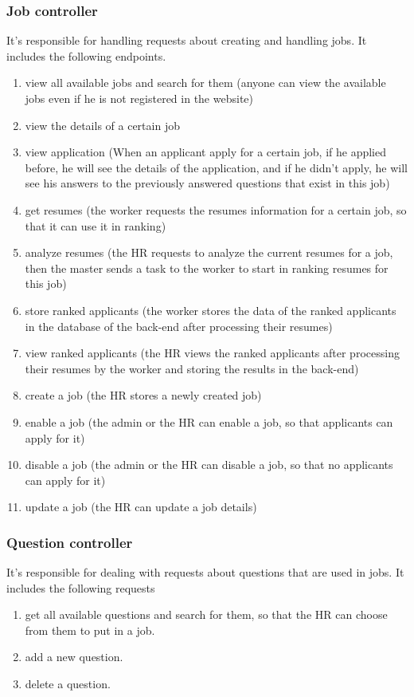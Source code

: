 \subsubsection{Job controller}
It's responsible for handling requests about creating and handling jobs. It includes the following endpoints.
\begin{enumerate}
    \item view all available jobs and search for them (anyone can view the available jobs even if he is not registered in the website)
    \item view the details of a certain job 
    \item view application (When an applicant apply for a certain job, if he applied before, he will see the details of the application, and if he didn't apply, he will see his answers to the previously answered questions that exist in this job)
    \item get resumes (the worker requests the resumes information for a certain job, so that it can use it in ranking)
    \item analyze resumes (the HR requests to analyze the current resumes for a job, then the master sends a task to the worker to start in ranking resumes for this job)
    \item store ranked applicants (the worker stores the data of the ranked applicants in the database of the back-end after processing their resumes)
    \item view ranked applicants (the HR views the ranked applicants after processing their resumes by the worker and storing the results in the back-end)
    \item create a job (the HR stores a newly created job)
    \item enable a job (the admin or the HR can enable a job, so that applicants can apply for it)
    \item disable a job (the admin or the HR can disable a job, so that no applicants can apply for it)
    \item update a job (the HR can update a job details)
\end{enumerate}

\subsubsection{Question controller}
It's responsible for dealing with requests about questions that are used in jobs. It includes the following requests
\begin{enumerate}
    \item get all available questions and search for them, so that the HR can choose from them to put in a job.
    \item add a new question.
    \item delete a question.
\end{enumerate}

